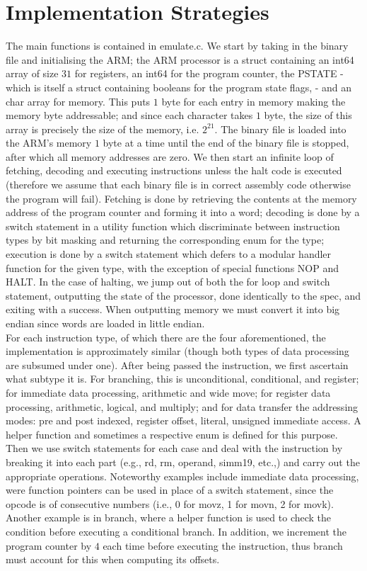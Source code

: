 \documentclass[11pt]{article}
\begin{document}
\section{Implementation Strategies}
The main functions is contained in emulate.c. We start by taking in the binary file and initialising the ARM; the ARM processor is a struct containing an int64 array of size $31$ for registers, an int64 for the program counter, the PSTATE - which is itself a struct containing booleans for the program state flags, - and an char array for memory. This puts $1$ byte for each entry in memory making the memory byte addressable; and since each character takes $1$ byte, the size of this array is precisely the size of the memory, i.e. $2^{21}$. The binary file is loaded into the ARM's memory $1$ byte at a time until the end of the binary file is stopped, after which all memory addresses are zero. We then start an infinite loop of fetching, decoding and executing instructions unless the halt code is executed (therefore we assume that each binary file is in correct assembly code otherwise the program will fail). Fetching is done by retrieving the contents at the memory address of the program counter and forming it into a word; decoding is done by a switch statement in a utility function which discriminate between instruction types by bit masking and returning the corresponding enum for the type; execution is done by a switch statement which defers to a modular handler function for the given type, with the exception of special functions NOP and HALT. In the case of halting, we jump out of both the for loop and switch statement, outputting the state of the processor, done identically to the spec, and exiting with a success. When outputting memory we must convert it into big endian since words are loaded in little endian.  \\
For each instruction type, of which there are the four aforementioned, the implementation is approximately similar (though both types of data processing are subsumed under one). After being passed the instruction, we first ascertain what subtype it is. For branching, this is unconditional, conditional, and register; for immediate data processing, arithmetic and wide move; for register data processing, arithmetic, logical, and multiply; and for data transfer the addressing modes: pre and post indexed, register offset, literal, unsigned immediate access. A helper function and sometimes a respective enum is defined for this purpose. Then we use switch statements for each case and deal with the instruction by breaking it into each part (e.g., rd, rm, operand, simm19, etc.,) and carry out the appropriate operations. Noteworthy examples include immediate data processing, were function pointers can be used in place of a switch statement, since the opcode is of consecutive numbers (i.e., 0 for movz, 1 for movn, 2 for movk). Another example is in branch, where a helper function is used to check the condition before executing a conditional branch. In addition, we increment the program counter by $4$ each time before executing the instruction, thus branch must account for this when computing its offsets. \\
\end{document}

